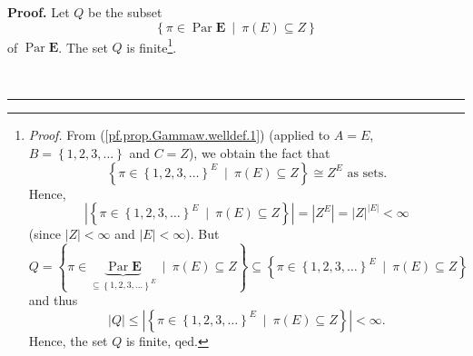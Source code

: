 \documentclass[numbers=enddot,12pt,final,onecolumn,notitlepage,abstracton]{scrartcl}
\theoremstyle{definition}
\newenvironment{proof}[1][Proof]{\noindent\textbf{#1.} }{\ \rule{0.5em}{0.5em}}
\newenvironment{verlong}{}{}
\begin{document}
\begin{verlong}
\begin{footnotesize}
\begin{proof}
Let $Q$ be the subset%
\[
\left\{  \pi\in\operatorname*{Par}\mathbf{E}\ \mid\ \pi\left(  E\right)
\subseteq Z\right\}
\]
of $\operatorname*{Par}\mathbf{E}$. The set $Q$ is
finite\footnote{\textit{Proof.} From (\ref{pf.prop.Gammaw.welldef.1}) (applied
to $A=E$, $B=\left\{  1,2,3,\ldots\right\}  $ and $C=Z$), we obtain the fact
that%
\[
\left\{  \pi\in\left\{  1,2,3,\ldots\right\}  ^{E}\ \mid\ \pi\left(  E\right)
\subseteq Z\right\}  \cong Z^{E}\text{ as sets.}%
\]
Hence,%
\[
\left\vert \left\{  \pi\in\left\{  1,2,3,\ldots\right\}  ^{E}\ \mid
\ \pi\left(  E\right)  \subseteq Z\right\}  \right\vert =\left\vert
Z^{E}\right\vert =\left\vert Z\right\vert ^{\left\vert E\right\vert }<\infty
\]
(since $\left\vert Z\right\vert <\infty$ and $\left\vert E\right\vert <\infty
$). But%
\[
Q=\left\{  \pi\in\underbrace{\operatorname*{Par}\mathbf{E}}_{\subseteq\left\{
1,2,3,\ldots\right\}  ^{E}}\ \mid\ \pi\left(  E\right)  \subseteq Z\right\}
\subseteq\left\{  \pi\in\left\{  1,2,3,\ldots\right\}  ^{E}\ \mid\ \pi\left(
E\right)  \subseteq Z\right\}
\]
and thus%
\[
\left\vert Q\right\vert \leq\left\vert \left\{  \pi\in\left\{  1,2,3,\ldots
\right\}  ^{E}\ \mid\ \pi\left(  E\right)  \subseteq Z\right\}  \right\vert
<\infty.
\]
Hence, the set $Q$ is finite, qed.}.


\end{proof}
\end{footnotesize}
\end{verlong}
\end{document}
